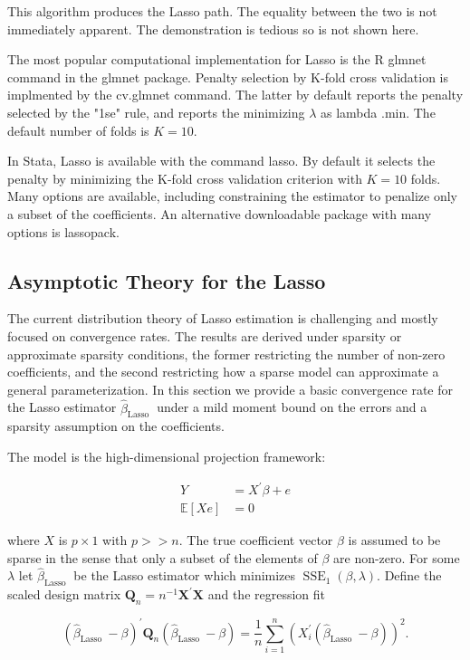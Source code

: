 \documentclass[10pt]{article}
\begin{document}
This algorithm produces the Lasso path. The equality between the two is not immediately apparent. The demonstration is tedious so is not shown here.

The most popular computational implementation for Lasso is the R glmnet command in the glmnet package. Penalty selection by K-fold cross validation is implmented by the $\mathrm{cv}$.glmnet command. The latter by default reports the penalty selected by the "1se" rule, and reports the minimizing $\lambda$ as lambda .min. The default number of folds is $K=10$.

In Stata, Lasso is available with the command lasso. By default it selects the penalty by minimizing the K-fold cross validation criterion with $K=10$ folds. Many options are available, including constraining the estimator to penalize only a subset of the coefficients. An alternative downloadable package with many options is lassopack.

\subsection{Asymptotic Theory for the Lasso}
The current distribution theory of Lasso estimation is challenging and mostly focused on convergence rates. The results are derived under sparsity or approximate sparsity conditions, the former restricting the number of non-zero coefficients, and the second restricting how a sparse model can approximate a general parameterization. In this section we provide a basic convergence rate for the Lasso estimator $\widehat{\beta}_{\text {Lasso }}$ under a mild moment bound on the errors and a sparsity assumption on the coefficients.

The model is the high-dimensional projection framework:

$$
\begin{aligned}
Y &=X^{\prime} \beta+e \\
\mathbb{E}[X e] &=0
\end{aligned}
$$

where $X$ is $p \times 1$ with $p>>n$. The true coefficient vector $\beta$ is assumed to be sparse in the sense that only a subset of the elements of $\beta$ are non-zero. For some $\lambda$ let $\widehat{\beta}_{\text {Lasso }}$ be the Lasso estimator which minimizes $\operatorname{SSE}_{1}(\beta, \lambda)$. Define the scaled design matrix $\boldsymbol{Q}_{n}=n^{-1} \boldsymbol{X}^{\prime} \boldsymbol{X}$ and the regression fit

$$
\left(\widehat{\beta}_{\text {Lasso }}-\beta\right)^{\prime} \boldsymbol{Q}_{n}\left(\widehat{\beta}_{\text {Lasso }}-\beta\right)=\frac{1}{n} \sum_{i=1}^{n}\left(X_{i}^{\prime}\left(\widehat{\beta}_{\text {Lasso }}-\beta\right)\right)^{2} .
$$
\end{document}
